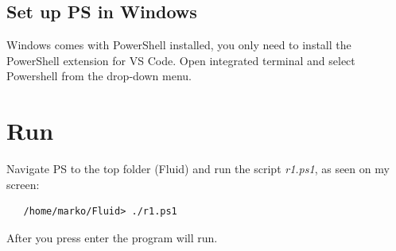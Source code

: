 \subsection{Set up PS in Windows}
Windows comes with PowerShell installed, you only need to install the PowerShell extension for VS Code. Open integrated terminal and select Powershell from the drop-down menu.

\section{Run}

Navigate PS to the top folder (Fluid) and run the script \emph{r1.ps1}, as seen on my screen:

\setlength{\textheight}{26.4cm}
\pagebreak
\setlength{\topmargin}{1.6cm}			%
\setlength{\headheight}{0.0cm}
\setlength{\headsep}{0.0cm}			%
\fancyhf{}
\fancyfoot[C]{\thepage}

\begin{lstlisting}
   /home/marko/Fluid> ./r1.ps1
\end{lstlisting}

After you press enter the program will run.


